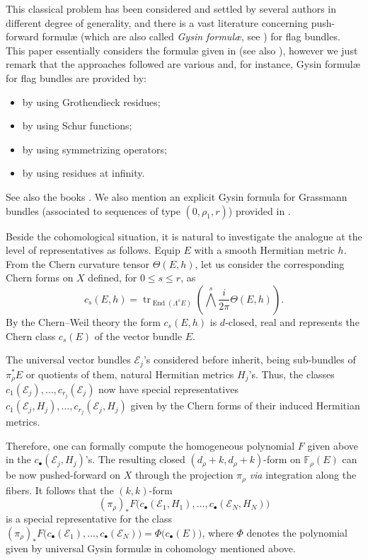 \documentclass[a4paper]{amsart}
\theoremstyle{plain}%
\theoremstyle{definition}
\theoremstyle{remark}
\newcommand{\FF}{\mathbb{F}}
\begin{document}
	This classical problem has been considered and settled by several authors in different degree of generality, and there is a vast literature concerning push-forward formul{\ae} (which are also called \emph{Gysin formul{\ae}}, see \cite{Ful98}) for flag bundles.
	This paper essentially considers the formul{\ae} given in \cite{DP17} (see also \cite{Ilo78}), however we just remark that the approaches followed are various and, for instance, Gysin formul{\ae} for flag bundles are provided by:
	\begin{itemize}
		\item \cite{Qui69,Dam73,AC87} by using Grothendieck residues;
		\item \cite{JLP81} by using Schur functions;
		\item \cite{Bri96,PR97} by using symmetrizing operators;
		\item \cite{BS12,Tu17,Zie18} by using residues at infinity.
	\end{itemize}
	See also the books \cite{FP98,Man98}.
	We also mention an explicit Gysin formula for Grassmann bundles (associated to sequences of type $ (0,\rho_{1},r) $) provided in \cite{KT15}.
	
	\medskip
	Beside the cohomological situation, it is natural to investigate the analogue at the level of representatives as follows.
	Equip $ E $ with a smooth Hermitian metric $ h $.
	From the Chern curvature tensor $ \Theta(E,h) $, let us consider the corresponding Chern forms on $ X $ defined, for $ 0 \le s \le r $, as
	\[
	c_s(E,h) = \operatorname{tr}_{\operatorname{End}({\Lambda}^{s} E)}\left( {\bigwedge}^s \frac{i}{2\pi} \Theta(E,h) \right).
	\]
	By the Chern--Weil theory the form $ c_s(E,h) $ is $ d $-closed, real and represents the Chern class $ c_s(E) $ of the vector bundle $ E $.
	
	The universal vector bundles $ \mathcal{E}_j $'s considered before inherit, being sub-bundles of $ \pi_{\rho}^{*} E $ or quotients of them, natural Hermitian metrics $ H_j $'s.
	Thus, the classes $ c_{1}(\mathcal{E}_j) , \dots, c_{r_j}(\mathcal{E}_j) $ now have special representatives $ c_{1}(\mathcal{E}_j,H_j) , \dots, c_{r_j}(\mathcal{E}_j,H_j) $ given by the Chern forms of their induced Hermitian metrics. 
	
	Therefore, one can formally compute the homogeneous polynomial $ F $ given above in the $ c_{\bullet}(\mathcal{E}_j,H_j) $'s.
	The resulting closed $ (d_\rho + k, d_\rho + k) $-form on $ \FF_{\rho}(E) $ can be now pushed-forward on $ X $ through the projection $ \pi_{\rho} $ \textsl{via} integration along the fibers.
	It follows that the $(k,k)$-form
	\[
	(\pi_{\rho})_{*} F \bigl( c_{\bullet}(\mathcal{E}_{1},H_1),\dots,c_{\bullet}(\mathcal{E}_{N},H_N) \bigr)
	\]
	is a special representative for the class $ (\pi_{\rho})_{*} F \bigl( c_{\bullet}(\mathcal{E}_{1}),\dots,c_{\bullet}(\mathcal{E}_{N}) \bigr) = \Phi\bigl(c_\bullet(E)\bigr) $, where $ \Phi $ denotes the polynomial given by universal Gysin formul{\ae} in cohomology mentioned above.
	
\end{document}
